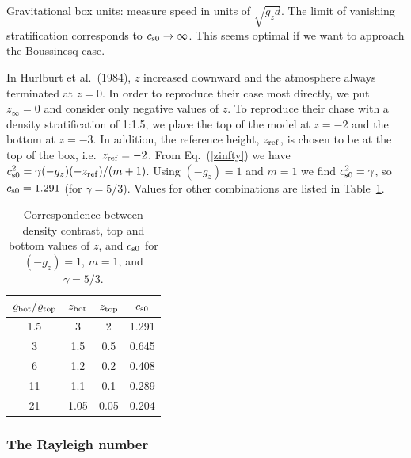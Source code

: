 \documentclass[\mydriver,12pt,twoside,notitlepage,a4paper]{article}
\begin{document}
Gravitational box units: measure speed in units of $\sqrt{g_z d}$.
The limit of vanishing stratification corresponds to
$c_{\rm s0}\rightarrow\infty$. This seems optimal if we want
to approach the Boussinesq case.

In Hurlburt et al.\ (1984), $z$ increased downward and the atmosphere
always terminated at $z=0$. In order to reproduce their case most
directly, we put $z_\infty=0$ and consider only negative values of $z$.
To reproduce their chase with a density stratification of 1:1.5, we place
the top of the model at $z=-2$ and the bottom at $z=-3$. In addition,
the reference height, $z_{\rm ref}$, is chosen to be at the top of the
box, i.e.\ $z_{\rm ref}=-2$. From Eq.~(\ref{zinfty}) we have
$c_{\rm s0}^2=\gamma(-g_z)(-z_{\rm ref})/(m+1)$. Using $(-g_z)=1$
and $m=1$ we find $c_{\rm s0}^2=\gamma$, so $c_{\rm s0}=1.291$
(for $\gamma=5/3$). Values for other combinations are listed in
Table~\ref{Tdensitycontrast}.

\begin{table}[htb]
  \begin{center}
    \caption{
      Correspondence between density contrast, top and bottom values
      of $z$, and $c_{\rm s0}$ for $(-g_z)=1$, $m=1$, and $\gamma=5/3$.
    }
    \label{Tdensitycontrast}
    \begin{tabular}{cccc}
    \toprule
$\varrho_{\rm bot}/\varrho_{\rm top}$ &
$z_{\rm bot}$ & $z_{\rm top}$ & $c_{\rm s0}$ \\
    \midrule
 1.5  & 3    & 2    & 1.291 \\
 3    & 1.5  & 0.5  & 0.645 \\
 6    & 1.2  & 0.2  & 0.408 \\
 11   & 1.1  & 0.1  & 0.289 \\
 21   & 1.05 & 0.05 & 0.204 \\
    \bottomrule
    \end{tabular}
  \end{center}
\end{table}

\subsubsection{The Rayleigh number}
\end{document}
